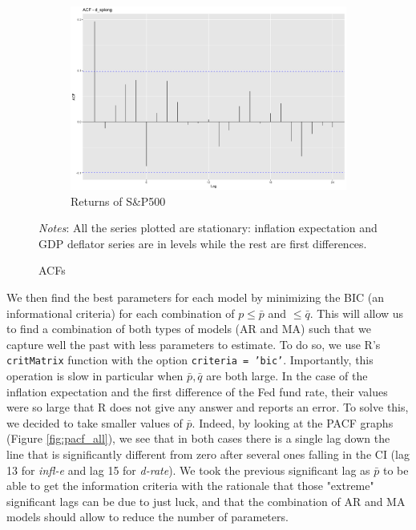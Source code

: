 \documentclass[hidelinks,12pts]{article}
\DeclareMathOperator{\1}{\mathbbm{1}}
\begin{document}
\begin{figure}[h!]
\begin{subfigure}[b]{0.45\textwidth}
        \includegraphics[width=\textwidth]{IMAGES/acf_sp.png}
        \caption*{Returns of S\&P500}
    \end{subfigure}
    \hfill 
    \caption{ACFs}
    \label{fig:acf_all}
    \begin{minipage}{0.9\textwidth}
        \small{\emph{Notes}: All the series plotted are stationary: inflation expectation and GDP deflator series are in levels while the rest are first differences.}
    \end{minipage}
\end{figure}

We then find the best parameters for each model by minimizing the BIC (an informational criteria) for each combination of $p \leq \bar{p}$ and $ \leq \bar{q}$. 
This will allow us to find a combination of both types of models (AR and MA) such that we capture well the past with less parameters to estimate.
To do so, we use R's \texttt{critMatrix} function with the option \texttt{criteria = 'bic'}. 
Importantly, this operation is slow in particular when $\bar{p}, \bar{q}$ are both large. In the case of the inflation expectation and the first difference of the Fed fund rate, their values were so large that R does not give any answer and reports an error. 
To solve this, we decided to take smaller values of $\bar{p}$. Indeed, by looking at the PACF graphs (Figure \ref{fig:pacf_all}), we see that in both cases there is a single lag down the line that is significantly different from zero after several ones falling in the CI (lag 13 for \emph{infl-e} and lag 15 for \emph{d-rate}). 
We took the previous significant lag as $\bar{p}$ to be able to get the information criteria with the rationale that those "extreme" significant lags can be due to just luck, and that the combination of AR and MA models should allow to reduce the number of parameters. 
\end{document}
